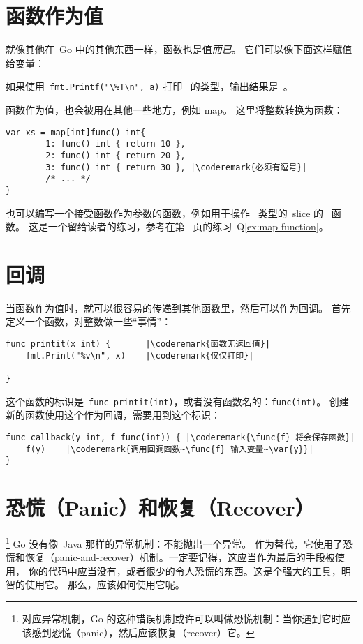 \section{函数作为值}
\label{sec:functions as values}
就像其他在~Go 中的其他东西一样，函数也是值\emph{而已}。
它们可以像下面这样赋值给变量：

如果使用~\lstinline{fmt.Printf("\%T\n", a)} 打印~ 的类型，输出结果是~。

函数作为值，也会被用在其他一些地方，例如 map。
这里将整数转换为函数：
\begin{lstlisting}[caption=使用 map 的函数作为值]
var xs = map[int]func() int{
        1: func() int { return 10 },
        2: func() int { return 20 },
        3: func() int { return 30 }, |\coderemark{必须有逗号}|
        /* ... */
}
\end{lstlisting}
也可以编写一个接受函数作为参数的函数，例如用于操作~ 类型的~slice 的~ 函数。
这是一个留给读者的练习，参考在第~\pageref{ex:map function} 页的练习~Q\ref{ex:map function}。

\section{回调}
\label{sec:callbacks}
当函数作为值时，就可以很容易的传递到其他函数里，然后可以作为回调。
首先定义一个函数，对整数做一些``事情''：
\begin{lstlisting}
func printit(x int) {       |\coderemark{函数无返回值}|
    fmt.Print("%v\n", x)    |\coderemark{仅仅打印}|

}
\end{lstlisting}
这个函数的标识是~\lstinline{func printit(int)}，或者没有函数名的：\mbox{\lstinline{func(int)}}。
创建新的函数使用这个作为回调，需要用到这个标识：
\begin{lstlisting}
func callback(y int, f func(int)) { |\coderemark{\func{f} 将会保存函数}|
    f(y)    |\coderemark{调用回调函数~\func{f} 输入变量~\var{y}}|
}
\end{lstlisting}

\section{恐慌（Panic）和恢复（Recover）}
\label{sec:panic}
\footnote{对应异常机制，Go 的这种错误机制或许可以叫做恐慌机制：当你遇到它时应该感到恐慌（panic），然后应该恢复（recover）它。}
Go 没有像~Java 那样的异常机制：不能抛出一个异常。
作为替代，它使用了恐慌和恢复（panic-and-recover）机制。一定要记得，这应当作为最后的手段被使用，
你的代码中应当没有，或者很少的令人恐慌的东西。这是个强大的工具，明智的使用它。
那么，应该如何使用它呢。

